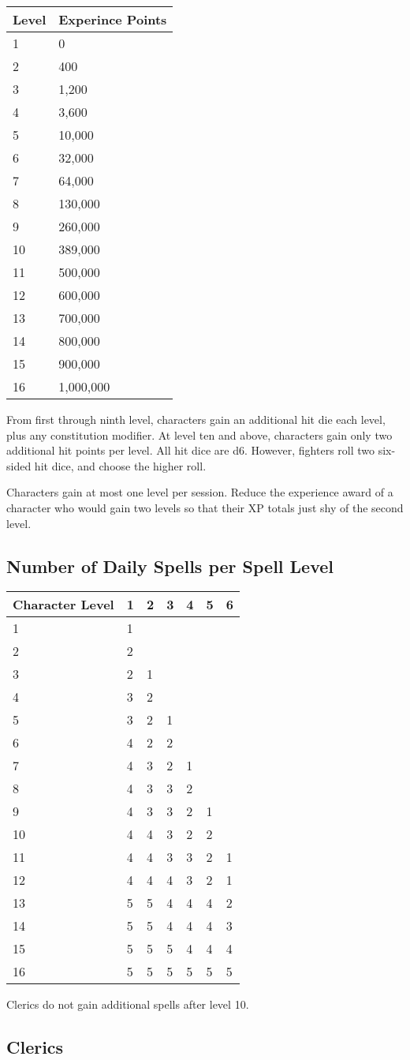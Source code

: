 \begin{longtable}[]{@{}ll@{}}
\toprule
Level & Experince Points\tabularnewline
\midrule
\endhead
1 & 0\tabularnewline
2 & 400\tabularnewline
3 & 1,200\tabularnewline
4 & 3,600\tabularnewline
5 & 10,000\tabularnewline
6 & 32,000\tabularnewline
7 & 64,000\tabularnewline
8 & 130,000\tabularnewline
9 & 260,000\tabularnewline
10 & 389,000\tabularnewline
11 & 500,000\tabularnewline
12 & 600,000\tabularnewline
13 & 700,000\tabularnewline
14 & 800,000\tabularnewline
15 & 900,000\tabularnewline
16 & 1,000,000\tabularnewline
\bottomrule
\end{longtable}

From first through ninth level, characters gain an additional hit die
each level, plus any constitution modifier. At level ten and above,
characters gain only two additional hit points per level. All hit dice
are d6. However, fighters roll two six-sided hit dice, and choose the
higher roll.

Characters gain at most one level per session. Reduce the experience
award of a character who would gain two levels so that their XP totals
just shy of the second level.

\subsection{Number of Daily Spells per Spell
Level}\label{number-of-daily-spells-per-spell-level}

\begin{longtable}[]{@{}lllllll@{}}
\toprule
Character Level & 1 & 2 & 3 & 4 & 5 & 6\tabularnewline
\midrule
\endhead
1 & 1 & & & & &\tabularnewline
2 & 2 & & & & &\tabularnewline
3 & 2 & 1 & & & &\tabularnewline
4 & 3 & 2 & & & &\tabularnewline
5 & 3 & 2 & 1 & & &\tabularnewline
6 & 4 & 2 & 2 & & &\tabularnewline
7 & 4 & 3 & 2 & 1 & &\tabularnewline
8 & 4 & 3 & 3 & 2 & &\tabularnewline
9 & 4 & 3 & 3 & 2 & 1 &\tabularnewline
10 & 4 & 4 & 3 & 2 & 2 &\tabularnewline
11 & 4 & 4 & 3 & 3 & 2 & 1\tabularnewline
12 & 4 & 4 & 4 & 3 & 2 & 1\tabularnewline
13 & 5 & 5 & 4 & 4 & 4 & 2\tabularnewline
14 & 5 & 5 & 4 & 4 & 4 & 3\tabularnewline
15 & 5 & 5 & 5 & 4 & 4 & 4\tabularnewline
16 & 5 & 5 & 5 & 5 & 5 & 5\tabularnewline
\bottomrule
\end{longtable}

Clerics do not gain additional spells after level 10.

\subsection{Clerics}\label{clerics}

